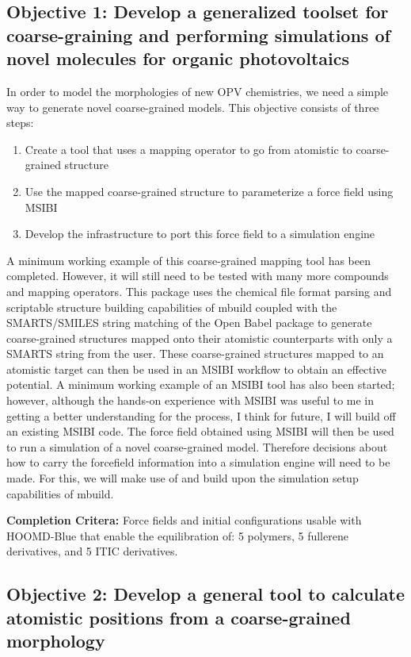\subsection*{Objective 1: Develop a generalized toolset for coarse-graining and performing simulations of novel molecules for organic photovoltaics}
In order to model the morphologies of new OPV chemistries, we need a simple way to generate novel coarse-grained models.
This objective consists of three steps:
\begin{enumerate}
    \item {Create a tool that uses a mapping operator to go from atomistic to coarse-grained structure}
    \item {Use the mapped coarse-grained structure to parameterize a force field using MSIBI}
    \item {Develop the infrastructure to port this force field to a simulation engine}
\end{enumerate}
A minimum working example of this coarse-grained mapping tool has been completed\cite{grits}.
However, it will still need to be tested with many more compounds and mapping operators.
This package uses the chemical file format parsing and scriptable structure building capabilities of mbuild coupled with the SMARTS/SMILES string matching of the Open Babel package to generate coarse-grained structures mapped onto their atomistic counterparts with only a SMARTS string from the user.
These coarse-grained structures mapped to an atomistic target can then be used in an MSIBI workflow to obtain an effective potential.
A minimum working example of an MSIBI tool has also been started; however, although the hands-on experience with MSIBI was useful to me in getting a better understanding for the process, I think for future, I will build off an existing MSIBI code\cite{msibi, Moore2014}.
The force field obtained using MSIBI will then be used to run a simulation of a novel coarse-grained model.
Therefore decisions about how to carry the forcefield information into a simulation engine will need to be made.
For this, we will make use of and build upon the simulation setup capabilities of mbuild.

\textbf{Completion Critera:} Force fields and initial configurations usable with HOOMD-Blue that enable the equilibration of: 5 polymers, 5 fullerene derivatives, and 5 ITIC derivatives. 

\subsection*{Objective 2: Develop a general tool to calculate atomistic positions from a coarse-grained morphology}

